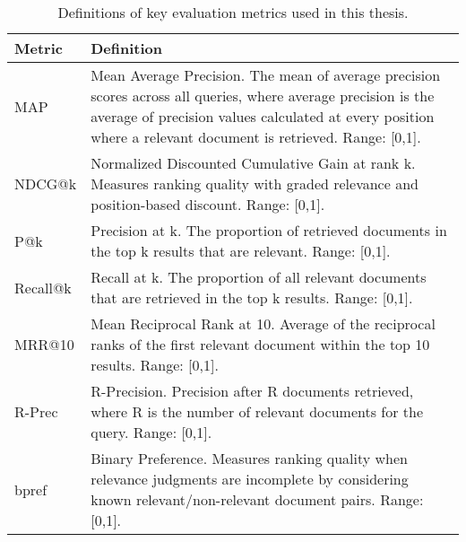 \begin{table}[htbp]
\centering
\caption{Definitions of key evaluation metrics used in this thesis.}
\label{tab:metric_definitions}
\small
\begin{tabularx}{\textwidth}{lX}
\toprule
\textbf{Metric} & \textbf{Definition} \\
\midrule
MAP & Mean Average Precision. The mean of average precision scores across all queries, where average precision is the average of precision values calculated at every position where a relevant document is retrieved. Range: [0,1]. \\
NDCG@k & Normalized Discounted Cumulative Gain at rank k. Measures ranking quality with graded relevance and position-based discount. Range: [0,1]. \\
P@k & Precision at k. The proportion of retrieved documents in the top k results that are relevant. Range: [0,1]. \\
Recall@k & Recall at k. The proportion of all relevant documents that are retrieved in the top k results. Range: [0,1]. \\
MRR@10 & Mean Reciprocal Rank at 10. Average of the reciprocal ranks of the first relevant document within the top 10 results. Range: [0,1]. \\
R-Prec & R-Precision. Precision after R documents retrieved, where R is the number of relevant documents for the query. Range: [0,1]. \\
bpref & Binary Preference. Measures ranking quality when relevance judgments are incomplete by considering known relevant/non-relevant document pairs. Range: [0,1]. \\
\bottomrule
\end{tabularx}
\end{table}
